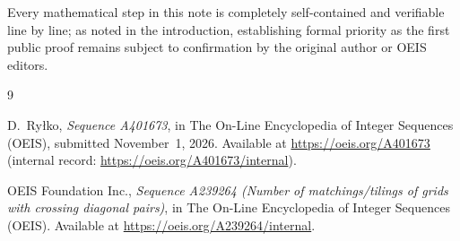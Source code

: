 \documentclass[11pt,a4paper]{article}
\theoremstyle{paperthm}
\theoremstyle{paperdef}
\begin{document}
Every mathematical step in this note is completely self-contained and verifiable line by line; as noted in the introduction, establishing formal priority as the first public proof remains subject to confirmation by the original author or OEIS editors.

\begin{thebibliography}{9}

D.~Ry\l ko,
\emph{Sequence A401673},
in The On-Line Encyclopedia of Integer Sequences (OEIS),
submitted November~1, 2026.
Available at \url{https://oeis.org/A401673} (internal record: \url{https://oeis.org/A401673/internal}).

OEIS Foundation Inc.,
\emph{Sequence A239264 (Number of matchings/tilings of grids with crossing diagonal pairs)},
in The On-Line Encyclopedia of Integer Sequences (OEIS).
Available at \url{https://oeis.org/A239264/internal}.

\end{thebibliography}
\end{document}
